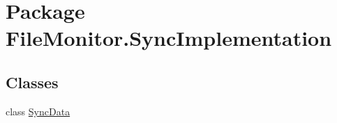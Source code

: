 \hypertarget{namespace_file_monitor_1_1_sync_implementation}{\section{Package File\-Monitor.\-Sync\-Implementation}
\label{namespace_file_monitor_1_1_sync_implementation}
}
\subsection*{Classes}
\begin{DoxyCompactItemize}
\item 
class \hyperlink{class_file_monitor_1_1_sync_implementation_1_1_sync_data}{Sync\-Data}
\end{DoxyCompactItemize}
